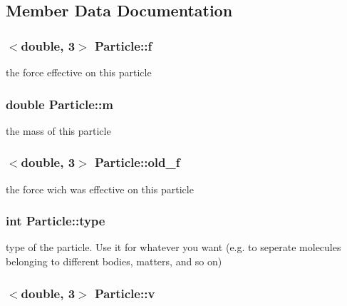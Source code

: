 \subsection{Member Data Documentation}
\hypertarget{classParticle_ad9aa3e171ea950b2cff1b4825e67845b}{
\subsubsection[{f}]{$<$double, 3$>$ Particle\-::f\hspace{0.3cm}{\ttfamily [private]}}}\label{classParticle_ad9aa3e171ea950b2cff1b4825e67845b}
the force effective on this particle \hypertarget{classParticle_aedcc7e1bc53b0e2b1a4a07c9a1b47563}{
\subsubsection[{m}]{\setlength{\rightskip}{0pt plus 5cm}double Particle\-::m\hspace{0.3cm}{\ttfamily [private]}}}\label{classParticle_aedcc7e1bc53b0e2b1a4a07c9a1b47563}
the mass of this particle \hypertarget{classParticle_ad9281e33474f23f7261f28848affc4a4}{
\subsubsection[{old\-\_\-f}]{$<$double, 3$>$ Particle\-::old\-\_\-f\hspace{0.3cm}{\ttfamily [private]}}}\label{classParticle_ad9281e33474f23f7261f28848affc4a4}
the force wich was effective on this particle \hypertarget{classParticle_a2b73dd42bcd56ba2e7ffeb0a5515a866}{
\subsubsection[{type}]{\setlength{\rightskip}{0pt plus 5cm}int Particle\-::type\hspace{0.3cm}{\ttfamily [private]}}}\label{classParticle_a2b73dd42bcd56ba2e7ffeb0a5515a866}
type of the particle. Use it for whatever you want (e.\-g. to seperate molecules belonging to different bodies, matters, and so on) \hypertarget{classParticle_ac3669e50d83d8608d522965b9acd1d8b}{
\subsubsection[{v}]{$<$double, 3$>$ Particle\-::v\hspace{0.3cm}{\ttfamily [private]}}}\label{classParticle_ac3669e50d83d8608d522965b9acd1d8b}
